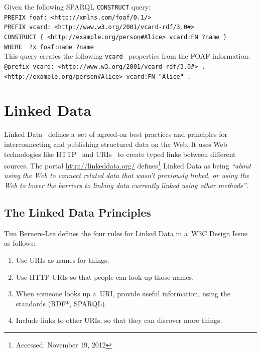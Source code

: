 \noindent Given the following SPARQL \texttt{CONSTRUCT} query:\\

\texttt{PREFIX foaf: <http://xmlns.com/foaf/0.1/>}\\
\texttt{\indent PREFIX vcard: <http://www.w3.org/2001/vcard-rdf/3.0\#>}\\
\texttt{\indent CONSTRUCT \{ <http://example.org/person\#Alice> vcard:FN ?name \}}\\
\texttt{\indent WHERE { ?x foaf:name ?name }}\\

\noindent This query creates the following
\texttt{vcard}~\cite{dawson1998vcard}
properties from the FOAF information:\\

\texttt{@prefix vcard: <http://www.w3.org/2001/vcard-rdf/3.0\#> .}\\ 
\texttt{\indent <http://example.org/person\#Alice> vcard:FN "Alice" .}

\section{Linked Data}

Linked Data~\cite{bernerslee2006linkeddata}
defines a~set of agreed-on best practices and
principles for interconnecting and publishing
structured data on the Web.
It uses Web technologies like HTTP~\cite{fielding1999http}
and URIs~\cite{bernerslee2005uri}
to create typed links between different sources.
The portal \url{http://linkeddata.org/}
defines\footnote{Accessed: November 19, 2012}
Linked Data as being
\textit{``about using the Web to connect related data that
wasn’t previously linked, or using the Web
to lower the barriers to linking data
currently linked using other methods''}.

\subsection{The Linked Data Principles}
\label{sec:linked-data-principles}

Tim Berners-Lee defines the four rules for Linked Data in a~W3C Design Issue~\cite{bernerslee2006linkeddata} as follows:

\begin{enumerate}
  \item Use URIs as names for things.
  \item Use HTTP URIs so that people can look up those names.
  \item When someone looks up a~URI, provide useful information,
        using the standards (RDF*, SPARQL).
  \item Include links to other URIs,
        so that they can discover more things.
\end{enumerate}

